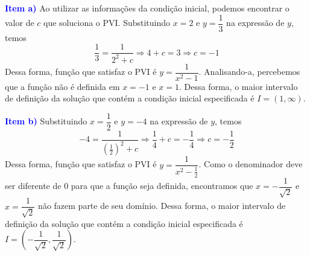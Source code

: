 \documentclass[oneside,12pt,a4paper]{report}
\begin{document}
        \begin{tcolorbox}[enhanced, breakable, colback=blue!1!white,colframe=blue!75!black,title=\textbf{\hyperlink{quest:ex6}{\hypertarget{resp:ex6}{Exercício 6}}}]

            \noindent\textcolor{blue}{\textbf{Item a)}} Ao utilizar as informações da condição inicial, podemos encontrar o valor de $c$ que soluciona o PVI. Substituindo $x=2$ e $y=\dfrac{1}{3}$ na expressão de $y$, temos
            \[\frac{1}{3} = \frac{1}{2^2+c} \Rightarrow 4+c = 3 \Rightarrow \boxed{c = -1}\]
            \noindent Dessa forma, função que satisfaz o PVI é $y = \dfrac{1}{x^2-1}$. Analisando-a, percebemos que a função não é definida em $x=-1$ e $x=1$. Dessa forma, o maior intervalo de definição da solução que contém a condição inicial especificada é  $I=(1, \infty)$.

            \noindent\textcolor{blue}{\textbf{Item b)}} Substituindo $x=\dfrac{1}{2}$ e $y=-4$ na expressão de $y$, temos
            \[-4 = \frac{1}{\left(\frac{1}{2}\right)^2+c} \Rightarrow \frac{1}{4}+c = -\frac{1}{4} \Rightarrow \boxed{c = -\frac{1}{2}}\]
            \noindent Dessa forma, função que satisfaz o PVI é $y = \dfrac{1}{x^2-\frac{1}{2}}$. Como o denominador deve ser diferente de $0$ para que a função seja definida, encontramos que $x=-\dfrac{1}{\sqrt{2}}$ e $x=\dfrac{1}{\sqrt{2}}$ não fazem parte de seu domínio. Dessa forma, o maior intervalo de definição da solução que contém a condição inicial especificada é  $I=\left(-\dfrac{1}{\sqrt{2}}, \dfrac{1}{\sqrt{2}}\right)$.

        \end{tcolorbox}
\end{document}
